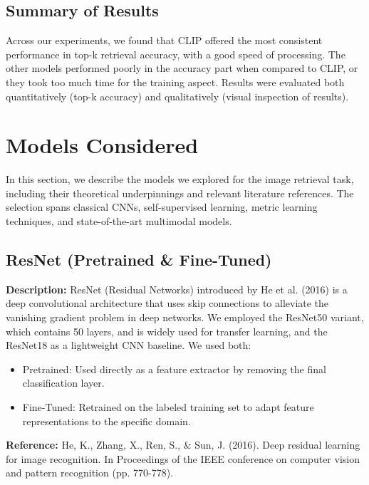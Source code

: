 \documentclass[10pt,twocolumn,letterpaper]{article}
\begin{document}
\subsection{Summary of Results}
Across our experiments, we found that CLIP offered the most consistent performance in top-k retrieval accuracy, with a good speed of processing. The other models performed poorly in the accuracy part when compared to CLIP, or they took too much time for the training aspect. Results were evaluated both quantitatively (top-k accuracy) and qualitatively (visual inspection of results).

\section{Models Considered}
In this section, we describe the models we explored for the image retrieval task, including their theoretical underpinnings and relevant literature references. The selection spans classical CNNs, self-supervised learning, metric learning techniques, and state-of-the-art multimodal models.

\subsection{ResNet (Pretrained \& Fine-Tuned)}
\textbf{Description:} ResNet (Residual Networks) introduced by He et al. (2016) is a deep convolutional architecture that uses skip connections to alleviate the vanishing gradient problem in deep networks. We employed the ResNet50 variant, which contains 50 layers, and is widely used for transfer learning, and the ResNet18 as a lightweight CNN baseline. We used both:
\begin{itemize}
  \item Pretrained: Used directly as a feature extractor by removing the final classification layer.
  \item Fine-Tuned: Retrained on the labeled training set to adapt feature representations to the specific domain.
\end{itemize}
\textbf{Reference:} He, K., Zhang, X., Ren, S., \& Sun, J. (2016). Deep residual learning for image recognition. In Proceedings of the IEEE conference on computer vision and pattern recognition (pp. 770-778).
\end{document}

